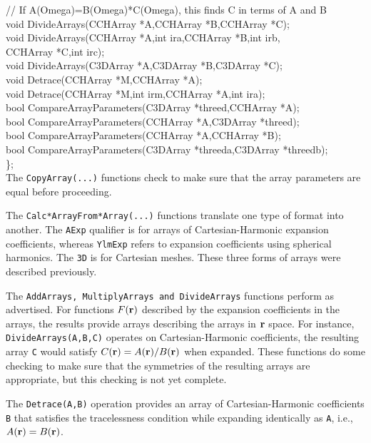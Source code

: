 \documentclass[10pt]{article}
\def\tab{\hspace*{9pt}}
\begin{document}
{\tab // If A(Omega)=B(Omega)*C(Omega), this finds C in terms of A and B\\
\tab void DivideArrays(CCHArray *A,CCHArray *B,CCHArray *C);\\
\tab void DivideArrays(CCHArray *A,int ira,CCHArray *B,int irb,\\
\tab \tab \tab CCHArray *C,int irc);\\
\tab void DivideArrays(C3DArray *A,C3DArray *B,C3DArray *C);\\

\tab void Detrace(CCHArray *M,CCHArray *A);\\
\tab void Detrace(CCHArray *M,int irm,CCHArray *A,int ira);\\

\tab bool CompareArrayParameters(C3DArray *threed,CCHArray *A);\\
\tab bool CompareArrayParameters(CCHArray *A,C3DArray *threed);\\
\tab bool CompareArrayParameters(CCHArray *A,CCHArray *B);\\
\tab bool CompareArrayParameters(C3DArray *threeda,C3DArray *threedb);\\
\};\\
}
The {\tt CopyArray(...)} functions check to make sure that the array parameters are equal before proceeding. 

The {\tt Calc*ArrayFrom*Array(...)} functions translate one type of format into another. The {\tt AExp} qualifier is for arrays of Cartesian-Harmonic expansion coefficients, whereas {\tt YlmExp} refers to expansion coefficients using spherical harmonics. The {\tt 3D} is for Cartesian meshes. These three forms of arrays were described previously.

The {\tt AddArrays, MultiplyArrays and DivideArrays} functions perform as advertised. For functions $F({\bf r})$ described by the expansion coefficients in the arrays, the results provide arrays describing the arrays in ${\bf r}$ space. For instance, {\tt DivideArrays(A,B,C)} operates on Cartesian-Harmonic coefficients, the resulting array {\tt C} would satisfy $C({\bf r})=A({\bf r})/B({\bf r})$ when expanded. These functions do some checking to make sure that the symmetries of the resulting arrays are appropriate, but this checking is not yet complete. 

The {\tt Detrace(A,B)} operation provides an array of Cartesian-Harmonic coefficients {\tt B} that satisfies the tracelessness condition while expanding identically as {\tt A}, i.e., $A({\bf r})=B({\bf r})$.
\end{document}
